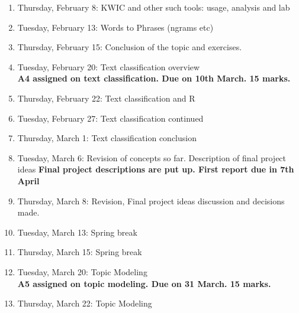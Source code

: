 \documentclass[11pt,a4paper]{article}
\begin{document}
\begin{enumerate}
\item Thursday, February 8: KWIC and other such tools: usage, analysis and lab 

\item Tuesday, February 13: Words to Phrases (ngrams etc)

\item Thursday, February 15: Conclusion of the topic and exercises.

\item Tuesday, February 20: Text classification overview
\\ \textbf{A4 assigned on text classification. Due on 10th March. 15 marks.}

\item Thursday, February 22: Text classification and R 

\item Tuesday, February 27: Text classification continued

\item Thursday, March 1: Text classification conclusion

\item Tuesday, March 6: Revision of concepts so far. Description of final project ideas
\textbf{Final project descriptions are put up. First report due in 7th April}

\item Thursday, March 8: Revision, Final project ideas discussion and decisions made.

\item Tuesday, March 13: Spring break

\item Thursday, March 15: Spring break

\item Tuesday, March 20: Topic Modeling 
\\ \textbf{A5 assigned on topic modeling. Due on 31 March. 15 marks.}


\item Thursday, March 22: Topic Modeling 


\end{enumerate}
\end{document}
